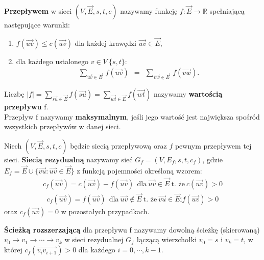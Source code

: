 \documentclass[12pt]{article}
\begin{document}
    \begin{definition}
        \textbf{Przepływem} w sieci $(V, \vec{E}, s, t, c)$ nazywamy funkcję $f: \vec{E} \rightarrow \mathbb{R}$
        spełniającą następujące warunki:
        \begin{enumerate}
            \item $f(\vec{uv}) \leq c(\vec{uv})$  dla każdej krawędzi $\vec{uv} \in \vec{E}$,
            \item dla każdego ustalonego $v \in V\ \{s, t\}:$
            \begin{align*}
                \sum_{\vec{uv} \in \vec{E}} ~ f(\vec{uv}) ~~ = ~~ \sum_{\vec{vw} \in \vec{E}} ~ f(\vec{vw}).
            \end{align*}
        \end{enumerate}
        Liczbę $|f| =  \sum_{\vec{su}  \in \vec{E}} f(\vec{su}) = \sum_{\vec{wt} \in \vec{E}} f(\vec{wt})$ nazywamy
        \textbf{wartością przepływu} f.\\

        Przepływ f nazywamy \textbf{maksymalnym}, jeśli jego wartość jest największa spośród wszystkich przepływów w
        danej sieci.
    \end{definition}

    \begin{definition}
        Niech $(V, \vec{E}, s, t, c)$ będzie siecią przepływową oraz $f$ pewnym przepływem tej sieci. \textbf{Siecią rezydualną}
        nazywamy sieć $G_f = (V, E_f, s, t, c_f)$, gdzie $E_f = \vec{E} \cup \{\vec{vu}: \vec{uv} \in \vec{E}\}$ z funkcją
        pojemności określoną wzorem:
        \begin{align*}
            c_f(\vec{uv}) = c(\vec{uv}) - f(\vec{uv}) ~~ \text{dla} ~ \vec{uv} \in  \vec{E} ~  \text{t. że} ~ c(\vec{uv}) > 0
        \end{align*}
        \begin{align*}
            c_f(\vec{uv}) = f(\vec{uv}) ~~ \text{dla} ~ \vec{uv} \notin  \vec{E} ~  \text{t. że} ~ \vec{vu} \in \vec{E} \text{i} f(\vec{uv}) > 0
        \end{align*}
        oraz $c_f(\vec{uv}) = 0$ w pozostałych przypadkach.
    \end{definition}

    \begin{definition}
        \textbf{Ścieżką rozszerzającą} dla przepływu f nazywamy dowolną ścieżkę (skierowaną) $v_0 \rightarrow v_1 \rightarrow \cdots \rightarrow v_k$
        w sieci rezydualnej $G_f$ łączącą wierzchołki $v_0 = s$ i $v_k = t$, w której $c_f(\vec{v_i v_{i+1}}) > 0$ dla
        każdego $i = 0, \cdots, k-1$.
    \end{definition}
\end{document}
